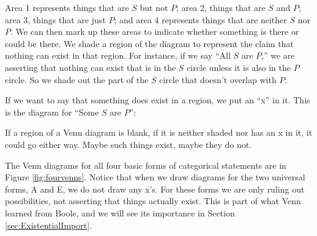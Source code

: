 Area 1 represents things that are $S$ but not $P$; area 2, things that are $S$ and $P$; area 3, things that are just $P$; and area 4 represents things that are neither $S$ nor $P$. We can then mark up these areas to indicate whether something is there or could be there. We shade a region of the diagram to represent the claim that nothing can exist in that region. For instance, if we say ``All $S$ are $P$,'' we are asserting that nothing can exist that is in the $S$ circle unless it is also in the $P$ circle. So we shade out the part of the $S$ circle that doesn't overlap with $P$. 

\begin{center}
\end{center}


If we want to say that something does exist in a region, we put an ``x'' in it. This is the diagram for ``Some $S$ are $P$'': 

\begin{center}
\end{center}

If a region of a Venn diagram is blank, if it is neither shaded nor has an x in it, it could go either way. Maybe such things exist, maybe they do not.

The Venn diagrams for all four basic forms of categorical statements are in Figure \ref{fig:fourvenns}. Notice that when we draw diagrams for the two universal forms, A and E, we do not draw any x's. For these forms we are only ruling out possibilities, not asserting that things actually exist. This is part of what Venn learned from Boole, and we will see its importance in Section \ref{sec:ExistentialImport}. 

